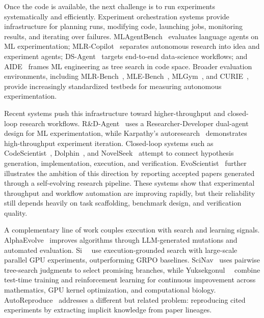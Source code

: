 Once the code is available, the next challenge is to run experiments systematically and efficiently. Experiment orchestration systems provide infrastructure for planning runs, modifying code, launching jobs, monitoring results, and iterating over failures. MLAgentBench~\cite{mlagentbench2024} evaluates language agents on ML experimentation; MLR-Copilot~\cite{mlrcopilot2024} separates autonomous research into idea and experiment agents; DS-Agent~\cite{dsagent2024} targets end-to-end data-science workflows; and AIDE~\cite{jiang2025aide} frames ML engineering as tree search in code space. Broader evaluation environments, including MLR-Bench~\cite{mlrbench2025}, MLE-Bench~\cite{chan2024mlebench}, MLGym~\cite{mlgym2025}, and CURIE~\cite{curie2025}, provide increasingly standardized testbeds for measuring autonomous experimentation.

Recent systems push this infrastructure toward higher-throughput and closed-loop research workflows. R\&D-Agent~\cite{chen2025rdagent} uses a Researcher-Developer dual-agent design for ML experimentation, while Karpathy's autoresearch~\cite{karpathy2025autoresearch} demonstrates high-throughput experiment iteration. Closed-loop systems such as CodeScientist~\cite{codescientist2025}, Dolphin~\cite{dolphin2025}, and NovelSeek~\cite{novelseek2025} attempt to connect hypothesis generation, implementation, execution, and verification. EvoScientist~\cite{evoscientist2026} further illustrates the ambition of this direction by reporting accepted papers generated through a self-evolving research pipeline. These systems show that experimental throughput and workflow automation are improving rapidly, but their reliability still depends heavily on task scaffolding, benchmark design, and verification quality.

A complementary line of work couples execution with search and learning signals. AlphaEvolve~\cite{alphaevolve2025} improves algorithms through LLM-generated mutations and automated evaluation. Si~\etal~\cite{si2026executiongrounded} use execution-grounded search with large-scale parallel GPU experiments, outperforming GRPO baselines. SciNav~\cite{scinav2026} uses pairwise tree-search judgments to select promising branches, while Yuksekgonul~\etal~\cite{yuksekgonul2026learntodiscover} combine test-time training and reinforcement learning for continuous improvement across mathematics, GPU kernel optimization, and computational biology. AutoReproduce~\cite{autoreproduce2025} addresses a different but related problem: reproducing cited experiments by extracting implicit knowledge from paper lineages.

